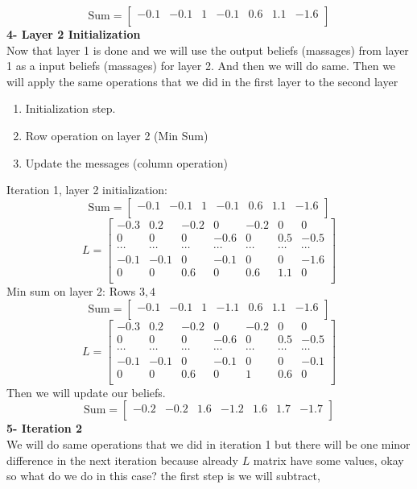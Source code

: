 \[ \text{Sum} = [\begin{matrix}-0.1&-0.1&1&-0.1&0.6&1.1&-1.6\\\end{matrix}] \]
\textbf{4- Layer 2 Initialization}\\
Now that layer 1 is done and we will use the output beliefs (massages) from layer 1 as a input beliefs (massages) for  layer 2. And then we will do same.
Then we will apply the same operations that we did in the first layer to the second layer
\begin{enumerate}
    \item Initialization step.
    \item Row operation on layer 2 (Min Sum)
    \item Update the messages (column operation)
\end{enumerate}
Iteration 1, layer 2 initialization:
\[ \text{Sum} =  [\begin{matrix}-0.1&-0.1&1&-0.1&0.6&1.1&-1.6\\\end{matrix}] \]
\[ L=\left[\begin{matrix}-0.3&0.2&-0.2&0&-0.2&0&0\\0&0&0&-0.6&0&0.5&-0.5\\\cdots&\cdots&\cdots&\cdots&\cdots&\cdots&\cdots\\-0.1&-0.1&0&-0.1&0&0&-1.6\\0&0&0.6&0&0.6&1.1&0\\\end{matrix}\right] \]
Min sum on layer 2: Rows $3, 4$
\[ \text{Sum} =  [\begin{matrix}-0.1&-0.1&1&-1.1&0.6&1.1&-1.6\\\end{matrix}] \]
\[ L=\left[\begin{matrix}-0.3&0.2&-0.2&0&-0.2&0&0\\0&0&0&-0.6&0&0.5&-0.5\\\cdots&\cdots&\cdots&\cdots&\cdots&\cdots&\cdots\\-0.1&-0.1&0&-0.1&0&0&-0.1\\0&0&0.6&0&1&0.6&0\\\end{matrix}\right] \]
Then we will update our beliefs.
\[ \text{Sum} = [\begin{matrix}-0.2&-0.2&1.6&-1.2&1.6&1.7&-1.7\\\end{matrix}] \]
\textbf{5- Iteration 2}\\
We will do same operations that we did in iteration 1 but there will be one minor difference in the next iteration because already $L$ matrix have some values, okay so what do we do in this case? the first step is we will subtract,
